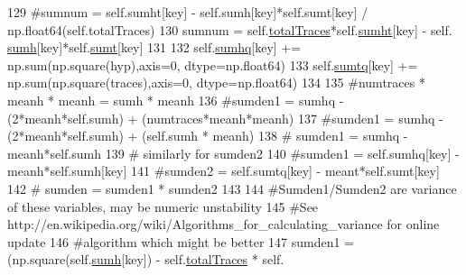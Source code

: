 \begin{DoxyCode}
{129             \textcolor{comment}{#sumnum =  self.sumht[key] - self.sumh[key]*self.sumt[key] / np.float64(self.totalTraces)}
130             sumnum = self.\hyperlink{classsoftware_1_1chipwhisperer_1_1analyzer_1_1attacks_1_1cpa__algorithms_1_1experimentalchannelinfo_1_1CPAProgressiveOneSubkey_a1f9a90b97cee6e8624329c0de7c2e292}{totalTraces}*self.\hyperlink{classsoftware_1_1chipwhisperer_1_1analyzer_1_1attacks_1_1cpa__algorithms_1_1experimentalchannelinfo_1_1CPAProgressiveOneSubkey_a59f4415f854eac5b02940eb3eccc0d84}{sumht}[key] - self.
      \hyperlink{classsoftware_1_1chipwhisperer_1_1analyzer_1_1attacks_1_1cpa__algorithms_1_1experimentalchannelinfo_1_1CPAProgressiveOneSubkey_a7b626cdb9f5cf746c43291b1d1f0aa4c}{sumh}[key]*self.\hyperlink{classsoftware_1_1chipwhisperer_1_1analyzer_1_1attacks_1_1cpa__algorithms_1_1experimentalchannelinfo_1_1CPAProgressiveOneSubkey_a4c14a5677ce305927aa6e9f4b45be9ea}{sumt}[key]
131 
132             self.\hyperlink{classsoftware_1_1chipwhisperer_1_1analyzer_1_1attacks_1_1cpa__algorithms_1_1experimentalchannelinfo_1_1CPAProgressiveOneSubkey_a7f280e8949b251a91fe7637685f256b0}{sumhq}[key] += np.sum(np.square(hyp),axis=0, dtype=np.float64)
133             self.\hyperlink{classsoftware_1_1chipwhisperer_1_1analyzer_1_1attacks_1_1cpa__algorithms_1_1experimentalchannelinfo_1_1CPAProgressiveOneSubkey_ac59fcc51f10d03bcc3f47c516d6c683d}{sumtq}[key] += np.sum(np.square(traces),axis=0, dtype=np.float64)
134 
135             \textcolor{comment}{#numtraces * meanh * meanh = sumh * meanh}
136             \textcolor{comment}{#sumden1 = sumhq - (2*meanh*self.sumh) + (numtraces*meanh*meanh)}
137             \textcolor{comment}{#sumden1 = sumhq - (2*meanh*self.sumh) + (self.sumh * meanh)}
138             \textcolor{comment}{# sumden1 = sumhq - meanh*self.sumh}
139             \textcolor{comment}{# similarly for sumden2}
140             \textcolor{comment}{#sumden1 = self.sumhq[key] - meanh*self.sumh[key]}
141             \textcolor{comment}{#sumden2 = self.sumtq[key] - meant*self.sumt[key]}
142             \textcolor{comment}{# sumden = sumden1 * sumden2}
143 
144             \textcolor{comment}{#Sumden1/Sumden2 are variance of these variables, may be numeric unstability}
145             \textcolor{comment}{#See http://en.wikipedia.org/wiki/Algorithms\_for\_calculating\_variance for online update}
146             \textcolor{comment}{#algorithm which might be better}
147             sumden1 = (np.square(self.\hyperlink{classsoftware_1_1chipwhisperer_1_1analyzer_1_1attacks_1_1cpa__algorithms_1_1experimentalchannelinfo_1_1CPAProgressiveOneSubkey_a7b626cdb9f5cf746c43291b1d1f0aa4c}{sumh}[key]) - self.\hyperlink{classsoftware_1_1chipwhisperer_1_1analyzer_1_1attacks_1_1cpa__algorithms_1_1experimentalchannelinfo_1_1CPAProgressiveOneSubkey_a1f9a90b97cee6e8624329c0de7c2e292}{totalTraces} * self.
}
\end{DoxyCode}
